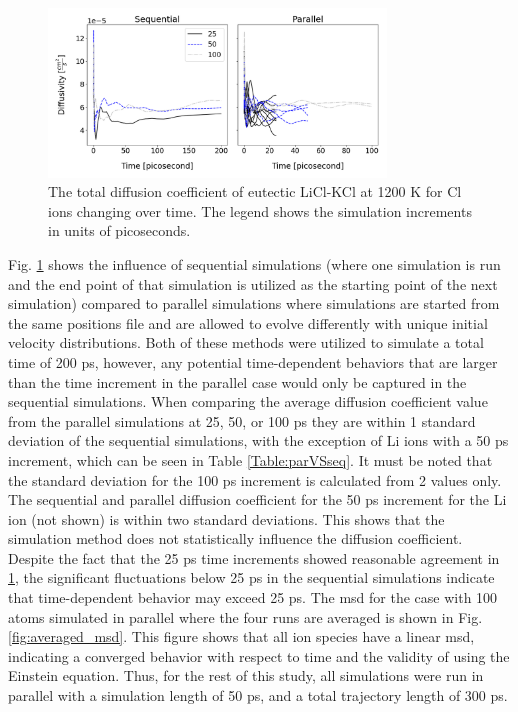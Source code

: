 \documentclass[review]{elsarticle}
\begin{document}
\begin{figure}[h!]
 \centering
 \includegraphics[width=0.8\textwidth]{SeqVsPar_Cl.png} 
 \caption{The total diffusion coefficient of eutectic LiCl-KCl at 1200 K for Cl ions changing over time. The legend shows the simulation increments in units of picoseconds.}
 \label{fig:SeqVsPar}
\end{figure} 

Fig. \ref{fig:SeqVsPar} shows the influence of sequential simulations (where one simulation is run and the end point of that simulation is utilized as the starting point of the next simulation) compared to parallel simulations where simulations are started from the same positions file and are allowed to evolve differently with unique initial velocity distributions. Both of these methods were utilized to simulate a total time of 200 ps, however, any potential time-dependent behaviors that are larger than the time increment in the parallel case would only be captured in the sequential simulations. When comparing the average diffusion coefficient value from the parallel simulations at 25, 50, or 100 ps they are within 1 standard deviation of the sequential simulations, with the exception of Li ions with a 50 ps increment, which can be seen in Table \ref{Table:parVSseq}. It must be noted that the standard deviation for the 100 ps increment is calculated from 2 values only. The sequential and parallel diffusion coefficient for the 50 ps increment for the Li ion (not shown) is within two standard deviations. This shows that the simulation method does not statistically influence the diffusion coefficient. Despite the fact that the 25 ps time increments showed reasonable agreement in \cref{fig:SeqVsPar}, the significant fluctuations below 25 ps in the sequential simulations indicate that time-dependent behavior may exceed 25 ps. The msd for the case with 100 atoms simulated in parallel where the four runs are averaged is shown in Fig. \ref{fig:averaged_msd}. This figure shows that all ion species have a linear msd, indicating a converged behavior with respect to time and the validity of using the Einstein equation. Thus, for the rest of this study, all simulations were run in parallel with a simulation length of 50 ps, and a total trajectory length of 300 ps.
\end{document}
